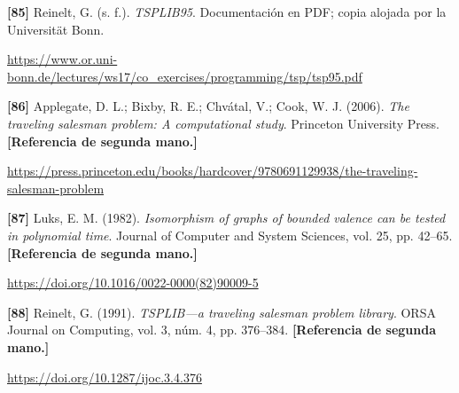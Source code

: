 \documentclass[11pt,a4paper]{article}
\newcommand{\referencia}[1]{\par\addvspace{0.8\baselineskip}\noindent\hangindent=1.1cm\hangafter=1 #1\par\nopagebreak}
\begin{document}
\begin{samepage}
\referencia{\textbf{[85]} Reinelt, G. (s. f.). \textit{{TSPLIB95}}. Documentaci{\'o}n en PDF; copia alojada por la Universit{\"a}t Bonn.}
 {\small\url{https://www.or.uni-bonn.de/lectures/ws17/co_exercises/programming/tsp/tsp95.pdf}}\par
\end{samepage}
\begin{samepage}
\referencia{\textbf{[86]} Applegate, D. L.; Bixby, R. E.; Chv{\'a}tal, V.; Cook, W. J. (2006). \textit{The traveling salesman problem: A computational study}. Princeton University Press. \textbf{[Referencia de segunda mano.]}}
 {\small\url{https://press.princeton.edu/books/hardcover/9780691129938/the-traveling-salesman-problem}}\par
\end{samepage}
\begin{samepage}
\referencia{\textbf{[87]} Luks, E. M. (1982). \textit{Isomorphism of graphs of bounded valence can be tested in polynomial time}. Journal of Computer and System Sciences, vol. 25, pp. 42--65. \textbf{[Referencia de segunda mano.]}}
 {\small\url{https://doi.org/10.1016/0022-0000(82)90009-5}}\par
\end{samepage}
\begin{samepage}
\referencia{\textbf{[88]} Reinelt, G. (1991). \textit{{TSPLIB}---a traveling salesman problem library}. ORSA Journal on Computing, vol. 3, núm. 4, pp. 376--384. \textbf{[Referencia de segunda mano.]}}
 {\small\url{https://doi.org/10.1287/ijoc.3.4.376}}\par
\end{samepage}
\end{document}
